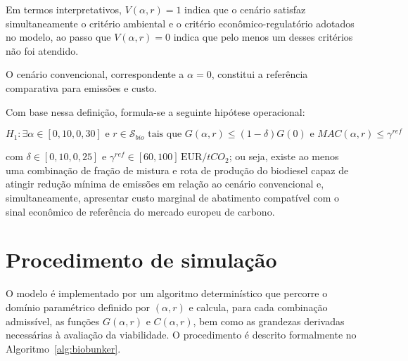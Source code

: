 Em termos interpretativos, $V(\alpha,r)=1$ indica que o cenário satisfaz simultaneamente o critério ambiental e o critério econômico-regulatório adotados no modelo, ao passo que $V(\alpha,r)=0$ indica que pelo menos um desses critérios não foi atendido.

O cenário convencional, correspondente a $\alpha = 0$, constitui a referência comparativa para emissões e custo.

Com base nessa definição, formula-se a seguinte hipótese operacional:

\[
H_1: \exists \alpha \in [0{,}10,0{,}30]
\text{ e } r \in \mathcal{S}_{bio}
\text{ tais que } G(\alpha,r) \leq (1-\delta)G(0)
\text{ e } MAC(\alpha,r) \leq \gamma^{ref}
\]

com $\delta \in [0{,}10,0{,}25]$ e $\gamma^{ref} \in [60,100]\,\text{EUR}/tCO_2$; ou seja, existe ao menos uma combinação de fração de mistura e rota de produção do biodiesel capaz de atingir redução mínima de emissões em relação ao cenário convencional e, simultaneamente, apresentar custo marginal de abatimento compatível com o sinal econômico de referência do mercado europeu de carbono.

\section{Procedimento de simulação}

O modelo é implementado por um algoritmo determinístico que percorre o domínio paramétrico definido por $(\alpha,r)$ e calcula, para cada combinação admissível, as funções $G(\alpha,r)$ e $C(\alpha,r)$, bem como as grandezas derivadas necessárias à avaliação da viabilidade. O procedimento é descrito formalmente no Algoritmo~\ref{alg:biobunker}.

